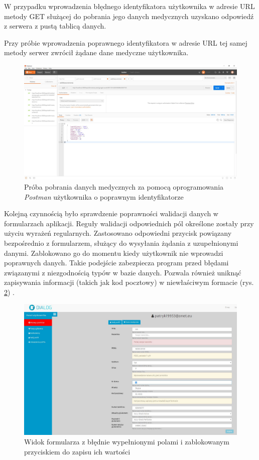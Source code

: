 W przypadku wprowadzenia błędnego identyfikatora użytkownika w adresie URL metody GET służącej do pobrania jego danych medycznych uzyskano odpowiedź z serwera z pustą tablicą danych. 

Przy próbie wprowadzenia poprawnego identyfikatora w adresie URL tej samej metody serwer zwrócił żądane dane medyczne użytkownika.

\newpage

\begin{figure}[h]
	\centering\includegraphics[scale=0.3]{images/postman2.JPG}
	\caption{Próba pobrania danych medycznych za pomocą oprogramowania \textit{Postman} użytkownika o poprawnym identyfikatorze}
	\label{Rys:postman_good}
\end{figure}

Kolejną czynnością było sprawdzenie poprawności walidacji danych w formularzach aplikacji. Reguły walidacji odpowiednich pól określone zostały przy użyciu wyrażeń regularnych. Zastosowano odpowiedni przycisk powiązany bezpośrednio z formularzem, służący do wysyłania żądania z uzupełnionymi danymi. Zablokowano go do momentu kiedy użytkownik nie wprowadzi poprawnych danych. Takie podejście zabezpiecza program przed błędami związanymi z niezgodnością typów w bazie danych. Pozwala również uniknąć zapisywania informacji (takich jak kod pocztowy) w niewłaściwym formacie (rys. \ref{Rys:form}) \cite{Ang}. 
  
\begin{figure}[h]
	\centering\includegraphics[scale=0.35]{images/form.JPG}
	\caption{Widok formularza z błędnie wypełnionymi polami i zablokowanym przyciskiem do zapisu ich wartości}
	\label{Rys:form}
\end{figure}



